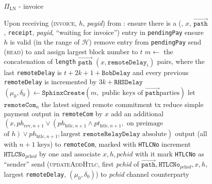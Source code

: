 \begin{figure}[H]
\begin{protocolbox}{$\Pi_{\mathrm{LN}}$ - invoice}
\begin{algorithmic}[1]
      \State Upon receiving (\textsc{invoice}, $h$, \textit{payid}) from \bob:
      \Indent
        \State ensure there is a (\bob, $x$, $\overrightarrow{\mathtt{path}}$,
        \texttt{receipt}, \textit{payid}, ``waiting for invoice'') entry in
        \texttt{pendingPay}
        \State ensure $h$ is valid (in the range of $\mathcal{H}$)
        \State remove entry from \texttt{pendingPay}
        \State send (\textsc{read}) to \ledger{} and assign largest block number
        to $t$
        \State $m \gets$ the concatenation of \texttt{length}
        $\overrightarrow{\mathtt{path}}$ $\left(x,
        \mathtt{remoteDelay}_i\right)$ pairs, where the last
        \texttt{remoteDelay} is $t + 2k + 1 + \mathtt{BobDelay}$ and every
        previous \texttt{remoteDelay} is incremented by $3k + \mathtt{RHSDelay}$
        \State $\left(\mu_0, \delta_0\right) \gets \mathtt{SphinxCreate}\left(m,
        \text{ public keys of } \overrightarrow{\mathtt{path}} \text{
        parties}\right)$
        \State let $\mathtt{remoteCom}_n$ the latest signed remote commitment tx
        \State reduce simple payment output in \texttt{remoteCom} by $x$
        \State add an additional $\left(x, ph_{\mathrm{rev}, n+1} \vee
        \left(ph_{\mathrm{htlc}, n+1} \wedge pt_{\mathrm{htlc}, n+1}, \text{ on
        preimage}\right.\right.$ $\left.\left.\text{of } h\right) \vee
        ph_{\mathrm{htlc}, n+1}, \text{largest } \mathtt{remoteRelayDelay}
        \text{ absolute}\right)$ output (all with $n+1$ keys) to
        \texttt{remoteCom}, marked with \texttt{HTLCNo}
        \State increment $\mathtt{HTLCNo}_{\textit{pchid}}$ by one and associate
        $x, h, \mathit{pchid}$ with it
        \State mark \texttt{HTLCNo} as ``sender''
        \State send (\textsc{updateAddHtlc}, first \textit{pchid} of
        $\overrightarrow{\mathtt{path}}, \mathtt{HTLCNo}_{\textit{pchid}}, x,
        h,$ largest \texttt{remoteDelay}, $\left(\mu_0, \delta_0\right)$) to
        \textit{pchid} channel counterparty
      \EndIndent
    \end{algorithmic}
  \end{protocolbox}
  \caption{}
  \label{alg:protocol:pay:invoice}
\end{figure}

